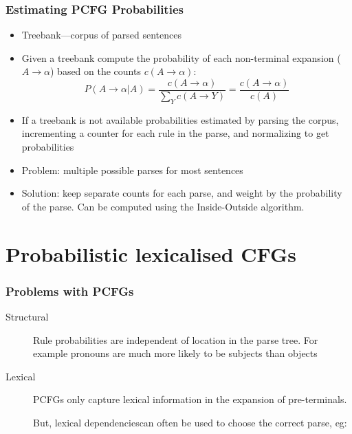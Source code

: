 \begin{frame}
  \frametitle{Estimating PCFG Probabilities}
  \begin{itemize}
  \item Treebank---corpus of parsed sentences 
  \item Given a treebank compute the probability of each non-terminal
    expansion ($A \rightarrow \alpha$) based on the counts $c(A \rightarrow \alpha)$:
    \[ P(A \rightarrow \alpha | A ) = 
    \frac{c(A \rightarrow \alpha)}{\sum_Y c(A \rightarrow Y)} =
    \frac{c(A \rightarrow \alpha)}{c(A)} \]
  \item If a treebank is not available probabilities estimated by
    parsing the corpus, incrementing a counter for each rule in the
    parse, and normalizing to get probabilities
  \item Problem: multiple possible parses for most sentences
  \item Solution: keep separate counts for each parse, and weight by
    the probability of the parse.  Can be computed using the
    Inside-Outside algorithm.
  \end{itemize}
\end{frame}



\section{Probabilistic lexicalised CFGs}

\begin{frame}
  \frametitle{Problems with PCFGs}
  \begin{description}
  \item[Structural] Rule probabilities are independent of location in
    the parse tree.  For example pronouns are much more likely to be
    subjects than objects
  \item[Lexical] PCFGs only capture lexical information in the
    expansion of pre-terminals.  

    But, lexical dependenciescan often be used to choose the correct
    parse, eg:

    
  \end{description}
\end{frame}

